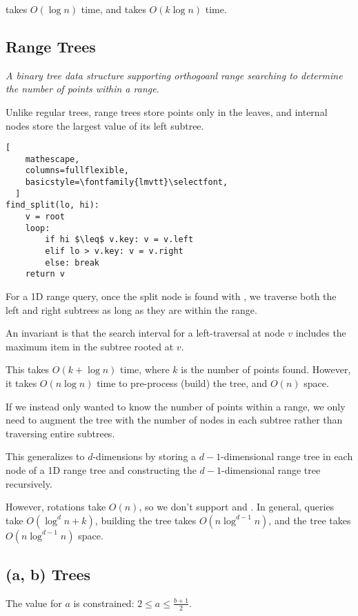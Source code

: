  takes $O(\log n)$ time, and  takes $O(k \log n)$ time.

\subsection{Range Trees}
\emph{A binary tree data structure supporting orthogoanl range searching to determine the number of points within a range.}

Unlike regular trees, range trees store points only in the leaves, and internal nodes store the largest value of its left subtree.

\begin{lstlisting}[
    mathescape,
    columns=fullflexible,
    basicstyle=\fontfamily{lmvtt}\selectfont,
  ]
find_split(lo, hi):
    v = root
    loop:
        if hi $\leq$ v.key: v = v.left
        elif lo > v.key: v = v.right
        else: break
    return v
\end{lstlisting}

For a 1D range query, once the split node is found with ,
we traverse both the left and right subtrees as long as they are within the  range.

An invariant is that the search interval for a left-traversal at node $v$ includes the maximum item in the subtree rooted at $v$.

This takes $O(k + \log n)$ time, where $k$ is the number of points found.
However, it takes $O(n \log n)$ time to pre-process (build) the tree, and $O(n)$ space.

If we instead only wanted to know the number of points within a range,
we only need to augment the tree with the number of nodes in each subtree rather
than traversing entire subtrees.

This generalizes to $d$-dimensions by storing a $d-1$-dimensional range tree in each node
of a 1D range tree and constructing the $d-1$-dimensional range tree recursively.

However, rotations take $O(n)$, so we don't support  and .
In general, queries take $O(\log^d n + k)$, building the tree takes $O(n \log^{d-1} n)$, and
the tree takes $O(n \log^{d-1} n)$ space.

\subsection{(a, b) Trees}
The value for $a$ is constrained: $2 \leq a \leq \frac{b + 1}{2}$.

